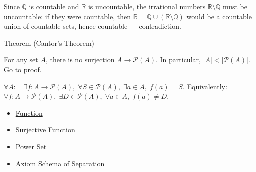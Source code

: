 \begin{remark*}[Consequence]
Since $\mathbb{Q}$ is countable and $\mathbb{R}$ is uncountable, the
irrational numbers $\mathbb{R} \setminus \mathbb{Q}$ must be uncountable:
if they were countable, then $\mathbb{R} = \mathbb{Q} \cup (\mathbb{R}
\setminus \mathbb{Q})$ would be a countable union of countable sets, hence
countable — contradiction.
\end{remark*}


\begin{theorembox}{Theorem (Cantor's Theorem)}
\begin{theorem}\label{thm:cantor}
For any set $A$, there is no surjection $A \to \mathcal{P}(A)$. In
particular, $|A| < |\mathcal{P}(A)|$.
\hyperref[prf:cantor]{Go to proof.}
\end{theorem}
\end{theorembox}

\begin{remark*}
$\forall A:\; \neg\exists f: A\to\mathcal{P}(A),\; \forall S\in\mathcal{P}(A),\; \exists a\in A,\; f(a)=S$. Equivalently: $\forall f: A\to\mathcal{P}(A),\; \exists D\in\mathcal{P}(A),\; \forall a\in A,\; f(a)\neq D$.
\end{remark*}


\begin{dependencies}
\begin{itemize}
  \item \hyperref[def:function]{Function}
  \item \hyperref[def:surjective]{Surjective Function}
  \item \hyperref[def:power-set]{Power Set}
  \item \hyperref[ax:separation]{Axiom Schema of Separation}
\end{itemize}
\end{dependencies}

